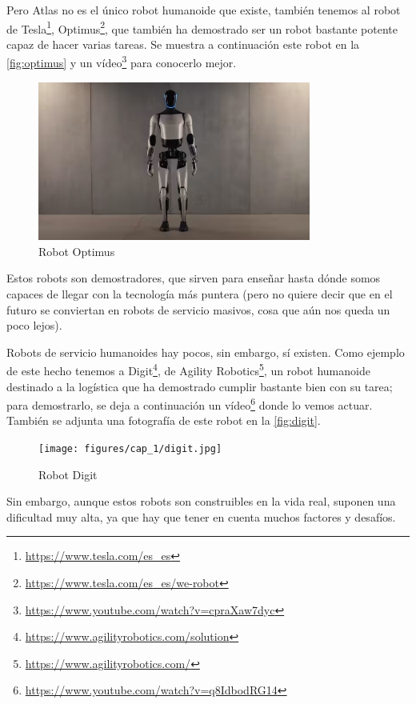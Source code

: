 Pero Atlas no es el único robot humanoide que existe, también tenemos al robot de Tesla\footnote{\url{https://www.tesla.com/es_es}}, Optimus\footnote{\url{https://www.tesla.com/es_es/we-robot}}, que también ha demostrado ser un robot bastante potente capaz de hacer varias tareas. Se muestra a continuación este robot en la \autoref{fig:optimus} y un vídeo\footnote{\url{https://www.youtube.com/watch?v=cpraXaw7dyc}} para conocerlo mejor.  

\begin{figure}[H]
    \centering
    \includegraphics[width=0.8\textwidth]{figures/cap_1/optimus.jpg}
    \caption{Robot Optimus}
    \label{fig:optimus}
\end{figure}

Estos robots son demostradores, que sirven para enseñar hasta dónde somos capaces de llegar con la tecnología más puntera (pero no quiere decir que en el futuro se conviertan en robots de servicio masivos, cosa que aún nos queda un poco lejos).

Robots de servicio humanoides hay pocos, sin embargo, sí existen. Como ejemplo de este hecho tenemos a Digit\footnote{\url{https://www.agilityrobotics.com/solution}}, de Agility Robotics\footnote{\url{https://www.agilityrobotics.com/}}, un robot humanoide destinado a la logística que ha demostrado cumplir bastante bien con su tarea; para demostrarlo, se deja a continuación un vídeo\footnote{\url{https://www.youtube.com/watch?v=q8IdbodRG14}} donde lo vemos actuar. También se adjunta una fotografía de este robot en la \autoref{fig:digit}.

\begin{figure}[H]
    \centering
    \texttt{[image: figures/cap\_1/digit.jpg]}
    \caption{Robot Digit}
    \label{fig:digit}
\end{figure}

Sin embargo, aunque estos robots son construibles en la vida real, suponen una dificultad muy alta, ya que hay que tener en cuenta muchos factores y desafíos.

